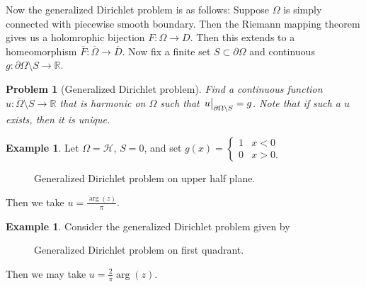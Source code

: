 \documentclass[leqno, openany]{memoir}
\newtheorem{prob}[thm]{Problem}
\theoremstyle{definition}
\newtheorem{exm}[thm]{Example}
\theoremstyle{remark}
\theoremstyle{plain}
\theoremstyle{definition}
\theoremstyle{remark}
\newcommand{\R}{\mathbb{R}}
\newcommand{\mc}[1]{\mathcal{#1}}
\newcommand{\ol}[1]{\overline{#1}}
\begin{document}
Now the generalized Dirichlet problem is as follows: Suppose $\Omega$ is simply connected with piecewise smooth boundary. Then the Riemann mapping theorem gives us a holomrophic bijection $F \colon \Omega \to D$. Then this extends to a homeomorphism $\ol{F} \colon \ol{\Omega} \to \ol{D}$. Now fix a finite set $S \subset \partial \Omega$ and continuous $g \colon \partial \Omega \setminus S \to \R$. 

\begin{prob}[Generalized Dirichlet problem]
    Find a continuous function $u \colon \ol{\Omega} \setminus S \to \R$ that is harmonic on $\Omega$ such that $\eval{u}_{\partial \Omega \setminus S} = g$. Note that if such a $u$ exists, then it is unique.
\end{prob}

\begin{exm}
    Let $\Omega = \mc{H}$, $S = 0$, and set $g(x) = \begin{cases}
        1 & x < 0 \\
        0 & x > 0.
    \end{cases}$
    \begin{figure}[H]
    \begin{center}
    \end{center}
    \caption{Generalized Dirichlet problem on upper half plane.}%
    \label{fig:generalized-dirichlet-problem-upper}
    \end{figure}
    Then we take $u = \frac{\arg(z)}{\pi}$.
\end{exm}

\begin{exm}
    Consider the generalized Dirichlet problem given by
    \begin{figure}[H]
    \begin{center}
    \end{center}
    \caption{Generalized Dirichlet problem on first quadrant.}%
    \label{fig:generalized-dirichlet-problem-first}
    \end{figure}
    Then we may take $u = \frac{2}{\pi} \arg(z)$.
\end{exm}
\end{document}

